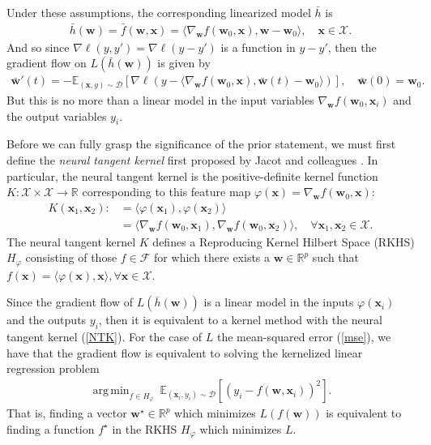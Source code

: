 \documentclass{article}
\DeclareMathOperator*{\argmin}{arg\,min}
\begin{document}
Under these assumptions, the corresponding linearized model $\bar{h}$ is
\begin{align*}
    \bar{h}(\boldsymbol{w}) = \bar{f}(\boldsymbol{w}, \boldsymbol{x}) = \langle \nabla_{\boldsymbol{w}} f(\boldsymbol{w}_0, \boldsymbol{x}), \boldsymbol{w}-\boldsymbol{w}_0\rangle, \quad \boldsymbol{x} \in \mathcal{X}. 
\end{align*}
And so since $\nabla \ell(y, y') = \nabla \ell(y - y')$ is a function in $y - y'$, then the gradient flow on $L(\bar{h}(\boldsymbol{w}))$ is given by
\begin{align*}
    \boldsymbol{\bar{w}}'(t) = - \mathbb{E}_{(\boldsymbol{x}, y) \sim \mathcal{D}}[\nabla \ell(y - \langle \nabla_{\boldsymbol{w}} f(\boldsymbol{w}_0, \boldsymbol{x}), \boldsymbol{\bar{w}}(t)-\boldsymbol{w}_0\rangle)], \quad \boldsymbol{\bar{w}}(0) = \boldsymbol{w}_0.
\end{align*}
But this is no more than a linear model in the input variables $\nabla_{\boldsymbol{w}} f(\boldsymbol{w}_0, \boldsymbol{x}_i)$ and the output variables $y_i$. 

Before we can fully grasp the significance of the prior statement, we must first define the \textit{neural tangent kernel} first proposed by Jacot and colleagues \cite{jacot2018neural}. In particular, the neural tangent kernel is the positive-definite kernel function $K: \mathcal{X} \times \mathcal{X} \rightarrow \mathbb{R}$ corresponding to this feature map $\varphi(\boldsymbol{x}) = \nabla_{\boldsymbol{w}} f(\boldsymbol{w}_0, \boldsymbol{x})$:
\begin{align}
    K(\boldsymbol{x}_1, \boldsymbol{x}_2) :&= \langle \varphi(\boldsymbol{x}_1), \varphi(\boldsymbol{x}_2) \rangle \nonumber \\
    &= \langle \nabla_{\boldsymbol{w}} f(\boldsymbol{w}_0, \boldsymbol{x}_1), \nabla_{\boldsymbol{w}} f(\boldsymbol{w}_0, \boldsymbol{x}_2) \rangle, \quad \forall \boldsymbol{x}_1, \boldsymbol{x}_2 \in \mathcal{X}\label{NTK}.
\end{align}
The neural tangent kernel $K$ defines a Reproducing Kernel Hilbert Space (RKHS) $H_{\varphi}$ consisting of those $f \in \mathcal{F}$ for which there exists a  $\boldsymbol{w} \in \mathbb{R}^p$ such that $f(\boldsymbol{x}) = \langle \varphi(\boldsymbol{x}), \boldsymbol{x} \rangle, \forall \boldsymbol{x} \in \mathcal{X}$. 

Since the gradient flow of $L(\bar{h}(\boldsymbol{w}))$ is a linear model in the inputs $\varphi(\boldsymbol{x}_i)$ and the outputs $y_i$, then it is equivalent to a kernel method with the neural tangent kernel (\ref{NTK}). For the case of $L$ the mean-squared error (\ref{mse}), we have that the gradient flow is equivalent to solving the kernelized linear regression problem
\begin{align*}
    \argmin_{f \in H_{\varphi}} \ \mathbb{E}_{(\boldsymbol{x}_i, y_i) \sim \mathcal{D}}\left[(y_i - f(\boldsymbol{w}, \boldsymbol{x}_i))^2 \right].
\end{align*}
That is, finding a vector $\boldsymbol{w}^{\star} \in \mathbb{R}^p$ which minimizes $L(f(\boldsymbol{w}))$ is equivalent to finding a function $f^{\star}$ in the RKHS $H_{\varphi}$ which minimizes $L$.
\end{document}
